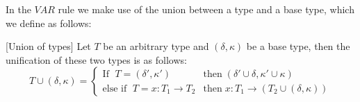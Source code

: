 \documentclass[../../master.tex]{subfiles}
\begin{document}
In the $VAR$ rule we make use of the union between a type and a base type, which we define as follows:

\begin{definition}{[Union of types]}
	Let $T$ be an arbitrary type and $(\delta,\kappa)$ be a base type, then the unification of these two types is as follows:
	\begin{equation*}
		T\cup(\delta,\kappa)=\left\{\begin{matrix}
			\mbox{If } \; T=(\delta',\kappa') & \mbox{then} \; (\delta'\cup\delta,\kappa'\cup\kappa)\\
			\mbox{else if } \; T=x:T_1\rightarrow T_2 & \mbox{then} \; x:T_1\rightarrow (T_2\cup(\delta,\kappa))
		\end{matrix}\right.
	\end{equation*}
\end{definition}
\end{document}
